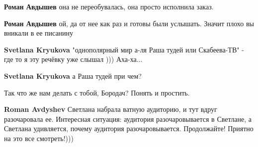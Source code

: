 \begin{itemize}
\begin{itemize}
 
\textbf{Роман Авдышев} она не переобувалась, она просто исполнила заказ.

 
\textbf{Роман Авдышев} ой, да от нее как раз и готовы были услышать. Значит плохо вы вникали в ее писанину

 
\textbf{Svetlana Kryukova} "однополярный мир а-ля Раша тудей или Скабеева-ТВ" - где то я эту речёвку уже слышал ))) Аха-ха...

 
\textbf{Svetlana Kryukova} а Раша тудей при чем?

 
Так что же нам делать с тобой, Бородач? Понять и простить.

 
\textbf{Roman Avdyshev} Светлана набрала ватную аудиторию, и тут вдруг разочаровала ее. Интересная ситуация: аудитория разочаровывается в Светлане, а Светлана удивляется, почему аудитория разочаровывается. Продолжайте! Приятно на это все смотреть!)))

 

\end{itemize}
\end{itemize}
